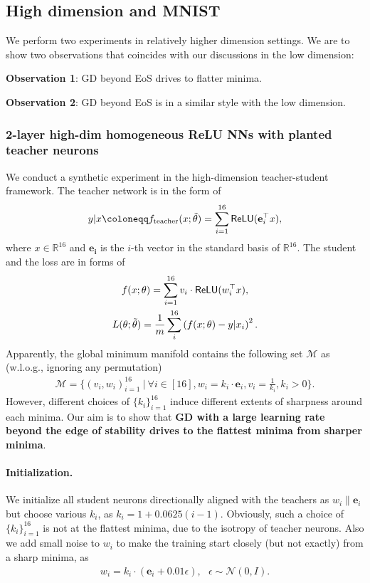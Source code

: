 \documentclass{article}
\theoremstyle{plain}
\theoremstyle{remark}
\def\R{\mathbb{R}}
\begin{document}
\subsection{High dimension and MNIST} \label{app:high_dim_exp}

We perform two experiments in relatively higher dimension settings. We are to show two observations that coincides with our discussions in the low dimension:
\vspace{10pt}

\centerline{\textbf{Observation 1}: GD beyond EoS drives to flatter minima.}

\vspace{5pt}
\centerline{\textbf{Observation 2}: GD beyond EoS is in a similar style with the low dimension.}

\subsubsection{2-layer high-dim homogeneous ReLU NNs with planted teacher neurons} \label{app:16-neuron}

We conduct a synthetic experiment in the high-dimension teacher-student framework. The teacher network is in the form of 
\begin{align}
    y|x \coloneqq f_{\text{teacher}}(x;\Tilde{\theta}) = \sum_{i=1}^{16} \textsf{ReLU}( \mathbf{e}_i^\top x),
\end{align}
where $x\in\R^{16}$ and $\mathbf{e_i}$ is the $i$-th vector in the standard basis of $\R^{16}$. The student and the loss are in forms of
\begin{gather}
     f(x;\theta) = \sum_{i=1}^{16} v_i\cdot \textsf{ReLU}( w_i^\top x),\\
     L(\theta;\Tilde{\theta})=\frac{1}{m}\sum_{i}^{16}
     \left( f(x;\theta)- y|x_i \right)^2.
\end{gather}
Apparently, the global minimum manifold contains the following set $\mathcal{M}$ as (w.l.o.g., ignoring any permutation)
\begin{align}
    \mathcal{M}=\{(v_i,w_i)_{i=1}^{16} ~|~ \forall i\in[16],  w_i=k_i\cdot \mathbf{e}_i, v_i=\frac{1}{k_i}, k_i>0\}.
\end{align}
However, different choices of $\{k_i\}_{i=1}^{16}$ induce different extents of sharpness around each minima. Our aim is to show that \textbf{GD with a large learning rate beyond the edge of stability drives to the flattest minima from sharper minima}.

\paragraph{Initialization.} We initialize all student neurons directionally aligned with the teachers as $w_i\parallel \mathbf{e}_i$ but choose various $k_i$, as $k_i= 1+0.0625(i-1)$. Obviously, such a choice of $\{k_i\}_{i=1}^{16}$ is not at the flattest minima, due to the isotropy of teacher neurons. Also we add small noise to $w_i$ to make the training start closely (but not exactly) from a sharp minima, as
\begin{align}
    w_i = k_i\cdot (\mathbf{e}_i+0.01\epsilon), ~~~\epsilon\sim \mathcal{N}(0,I).
\end{align}
\end{document}
